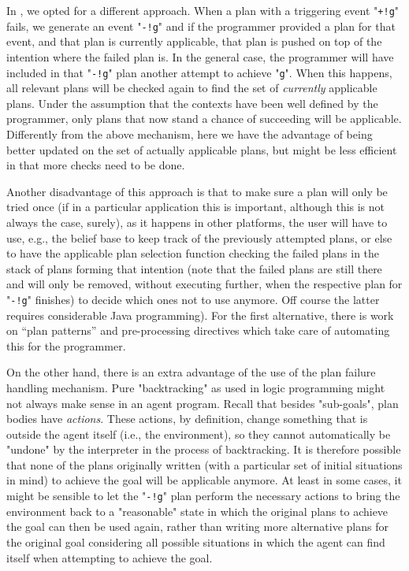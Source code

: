 \documentclass{article}
\newcommand{\jason}[0]{\htlink{\textit{Jason}}{http://jason.sf.net}\xspace}
\begin{document}
\begin{description}
In \jason, we opted for a different approach. When a plan with a
triggering event "\texttt{+!g}" fails, we generate an event
"\texttt{-!g}" and if the programmer provided a plan for that event,
and that plan is currently applicable, that plan is pushed on top of the
intention where the failed plan is. In the general case, the
programmer will have included in that "\texttt{-!g}" plan another
attempt to achieve "\texttt{g}". When this happens, all relevant plans
will be checked again to find the set of \emph{currently} applicable
plans. Under the assumption that the contexts have been well defined
by the programmer, only plans that now stand a chance of succeeding
will be applicable. Differently from the above mechanism, here we have
the advantage of being better updated on the set of actually
applicable plans, but might be less efficient in that more checks need
to be done.

Another disadvantage of this approach is that to make sure a plan will
only be tried once (if in a particular application this is important,
although this is not always the case, surely), as it happens in other
platforms, the user will have to use, e.g., the belief base to keep
track of the previously attempted plans, or else to have the
applicable plan selection function checking the failed plans in the
stack of plans forming that intention (note that the failed plans are
still there and will only be removed, without executing further, when
the respective plan for "\texttt{-!g}" finishes) to decide which ones
not to use anymore. Off course the latter requires considerable Java
programming). For the first alternative, there is work on ``plan
patterns'' and pre-processing directives which take care of automating
this for the programmer.

On the other hand, there is an extra advantage of the use of the
\jason plan failure handling mechanism. Pure "backtracking" as used in
logic programming might not always make sense in an agent program.
Recall that besides "sub-goals", plan bodies have \emph{actions}.
These actions, by definition, change something that is outside the
agent itself (i.e., the environment), so they cannot automatically be
"undone" by the interpreter in the process of backtracking. It is
therefore possible that none of the plans originally written (with a
particular set of initial situations in mind) to achieve the goal will
be applicable anymore. At least in some cases, it might be sensible to
let the "\texttt{-!g}" plan perform the necessary actions to bring the
environment back to a "reasonable" state in which the original plans
to achieve the goal can then be used again, rather than writing more
alternative plans for the original goal considering all possible
situations in which the agent can find itself when attempting to
achieve the goal.


\end{description}
\end{document}

